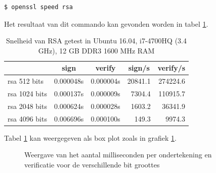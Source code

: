 \begin{lstlisting}[language=bash, caption={Commando om de snelheid van RSA te
testen}]
$ openssl speed rsa
\end{lstlisting}

Het resultaat van dit commando kan gevonden worden in tabel
\ref{tab:rsa-speed-test}.

\begin{table}[H]
	\centering
	\begin{tabular}{ l | l | l | r | r }
		& \multicolumn{1}{c}{sign} & \multicolumn{1}{c}{verify} &
		\multicolumn{1}{c}{sign/s} & \multicolumn{1}{c}{verify/s} \\
		\hline
		rsa  512 bits & 0.000048s & 0.000004s &  20841.1 & 274224.6 \\
		rsa 1024 bits & 0.000137s & 0.000009s &   7304.4 & 110915.7 \\
		rsa 2048 bits & 0.000624s & 0.000028s &   1603.2 &  36341.9 \\
		rsa 4096 bits & 0.006696s & 0.000100s &    149.3 &   9974.3 \\
	\end{tabular}
	\caption{Snelheid van RSA getest in Ubuntu 16.04, i7-4700HQ (3.4 GHz), 12 GB
		DDR3 1600 MHz RAM}
	\label{tab:rsa-speed-test}
\end{table}

Tabel \ref{tab:rsa-speed-test} kan weergegeven als box plot zoals in grafiek
\ref{fig:rsa-sign-verify-speed-graph}.

\begin{figure}[H]
	\centering
	\caption{Weergave van het aantal milliseconden per ondertekening en
		verificatie
		voor de verschillende bit groottes}
	\label{fig:rsa-sign-verify-speed-graph}
\end{figure}

